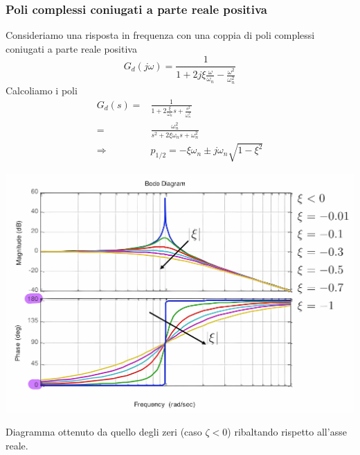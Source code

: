\documentclass{article}
\numberwithin{equation}{subsection}
\begin{document}
\subsubsection{Poli complessi coniugati a parte reale positiva}
Consideriamo una risposta in frequenza con una coppia di poli complessi coniugati a parte reale positiva
\[
    G_d(j\omega) = \frac{1}{1+2j \xi \frac{\omega}{\omega_n} - \frac{\omega^2}{\omega_n^2}}  \tag*{$\xi < 0$}
\]
Calcoliamo i poli
\begin{align*}
    G_d(s) =& \frac{1}{1+2 \frac{\xi}{\omega_n}s + \frac{s^2}{\omega_n^2}}\\
    =& \frac{\omega_n^2}{s^2+2 \xi \omega_n s + \omega_n^2}\\
    \Longrightarrow& p_{1/2} = - \xi \omega_n \pm j \omega_n \sqrt{1 - \xi^2}
\end{align*}
\begin{center}
    \includegraphics[scale=0.15]{Images/Diagramma_poli_cc_pos.png}
\end{center}
Diagramma ottenuto da quello degli zeri (caso $\zeta<0$) ribaltando rispetto all'asse reale.
\end{document}
